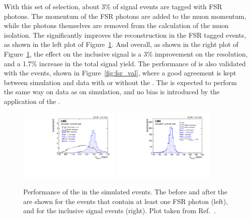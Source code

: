 With this set of selection, about 3\% of signal events are tagged with FSR photons.
The momentum of the FSR photons are added to the muon momentum, 
while the photons themselves are removed from the calculation of the muon isolation.
The \FSR significantly improves the \mmm reconstruction in the FSR tagged events, as shown in the left plot of Figure~\ref{fig:fsr_sig}.
And overall, as shown in the right plot of Figure~\ref{fig:fsr_sig}, the effect on the inclusive signal is a 3\% improvement on the \mmm resolution, 
and a 1.7\% increase in the total signal yield. 
The performance of \FSR is also validated with the \zmm events, shown in Figure~\ref{fig:fsr_val},
where a good agreement is kept between simulation and data with or without the \FSR. 
The \FSR is expected to perform the same way on data as on simulation, 
and no bias is introduced by the application of the \FSR. 

\begin{figure}[!htb]
      \centering
      \captionsetup{justification=justified}
      \includegraphics[width=0.45\textwidth]{pics/muon_corr/FSR/FSRrecovery_FSRtagged.pdf}
      \includegraphics[width=0.45\textwidth]{pics/muon_corr/FSR/FSRrecovery_FullSignal.pdf}
      \caption{Performance of the \FSR in the simulated \hmm events. 
               The \mmm before and after the \FSR are shown for the events that contain at least one FSR photon (left),
               and for the inclusive signal events (right).
               Plot taken from Ref.~\cite{oliverthesis}.}
      \label{fig:fsr_sig}
\end{figure}

